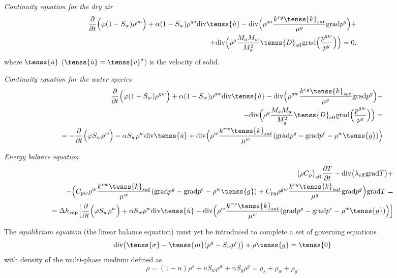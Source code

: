 {\it Continuity equation for the dry air}
\begin{eqnarray}\label{air}
\frac{\partial}{\partial t}\Big(\varphi(1-S_w)\rho^{ga}\Big) + \alpha(1-S_w)\rho^{ga} {\rm div} \tenss{\dot{u}} - 
{\rm div} \Big( \rho^{ga}\frac{k^{rg}\tenss{k}_{sat}}{{\mu}^{g}} {\rm grad}p^g\Big) + \nonumber\\
+{\rm div} \Big( \rho^g \frac{M_a M_w}{M^2_g} \tenss{D}_{\rm eff} {\rm grad} \Big( \frac{p^{gw}}{p^g} \Big) \Big) = 0,
\end{eqnarray}
where $\tenss{\dot{u}}$ ($\tenss{\dot{u}} = \tenss{v}^s$) is the velocity of solid.

{ \it Continuity equation for the water species}
\begin{eqnarray}\label{water}
\frac{\partial}{\partial t}\Big(\varphi(1-S_w)\rho^{gw}\Big) + \alpha(1-S_w)\rho^{gw} {\rm div} \tenss{\dot{u}} - 
{\rm div} \Big( \rho^{gw}\frac{k^{rg}\tenss{k}_{sat}}{{\mu}^{g}} {\rm grad}p^g\Big) + \nonumber\\
-{\rm div} \Big( \rho^g \frac{M_a M_w}{M^2_g} \tenss{D}_{\rm eff} {\rm grad} \Big( \frac{p^{gw}}{p^g} \Big) \Big) = \nonumber\\
=-\frac{\partial}{\partial t}\Big(\varphi S_w\rho^{w}\Big) - \alpha S_w \rho^{w} {\rm div} \tenss{\dot{u}} + 
{\rm div} \Big( \rho^{w}\frac{k^{rw}\tenss{k}_{sat}}{{\mu}^{w}} ({\rm grad}p^g - {\rm grad}p^c - \rho^w\tenss{g})\Big)
\end{eqnarray}

{ \it Energy balance equation}
 \begin{eqnarray}\label{heat}
\big( \rho C_p \big)_{\rm eff} \frac{\partial T}{\partial t} - {\rm div}\big(\lambda_{\rm eff}{\rm grad}T\big) + \nonumber\\
- \Big(C_{pw} \rho^w \frac{k^{rw}\tenss{k}_{sat}}{{\mu}^{w}} ({\rm grad}p^g - {\rm grad}p^c - \rho^w\tenss{g}) + 
C_{pg} \rho^{gw}  \frac{k^{rg}\tenss{k}_{sat}}{{\mu}^{g}} {\rm grad}p^g\Big) {\rm grad}T = \nonumber\\
=\Delta h_{\rm vap} \Big[\frac{\partial}{\partial t}\Big(\varphi S_w\rho^{w}\Big) + \alpha S_w \rho^{w} {\rm div} \tenss{\dot{u}} -
{\rm div} \Big( \rho^{w}\frac{k^{rw}\tenss{k}_{sat}}{{\mu}^{w}} ({\rm grad}p^g - {\rm grad}p^c - \rho^w\tenss{g})\Big)\Big]
\end{eqnarray}

The { \it equilibrium equation} (the linear balance equation) must yet be introduced to complete a set of governing 
equations
\begin{equation}\label{d19}
{\rm div} \big(\tenss{\sigma} - \tenss{m}(p^g - S_w p^c)\big)+ \rho \tenss{g} = \tenss{\rm 0}
\end{equation}
with density of the multi-phase medium defined as
\begin{equation}\label{d20}
\rho = (1-n)\rho^s + nS_w\rho^w + nS_g\rho^g = \rho_s + \rho_w + \rho_g.
\end{equation}

